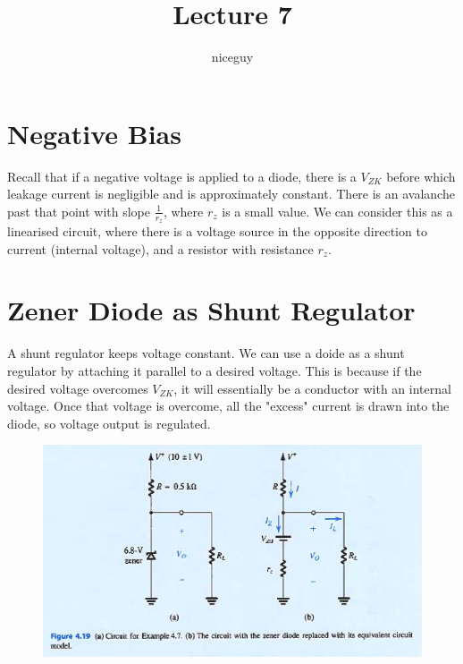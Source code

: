 \documentclass[12pt]{article}
\title{Lecture 7}
\author{niceguy}
\begin{document}
\maketitle

\section{Negative Bias}

Recall that if a negative voltage is applied to a diode, there is a $V_{ZK}$ before which leakage current is negligible and is approximately constant. There is an avalanche past that point with slope $\frac{1}{r_z}$, where $r_z$ is a small value. We can consider this as a linearised circuit, where there is a voltage source in the opposite direction to current (internal voltage), and a resistor with resistance $r_z$.

\section{Zener Diode as Shunt Regulator}

A shunt regulator keeps voltage constant. We can use a doide as a shunt regulator by attaching it parallel to a desired voltage. This is because if the desired voltage overcomes $V_{ZK}$, it will essentially be a conductor with an internal voltage. Once that voltage is overcome, all the "excess" current is drawn into the diode, so voltage output is regulated.

\begin{figure}[h]
    \begin{center}
    \includegraphics[width=\textwidth]{shunt.png}
    \end{center}
\end{figure}
    
\end{document}
